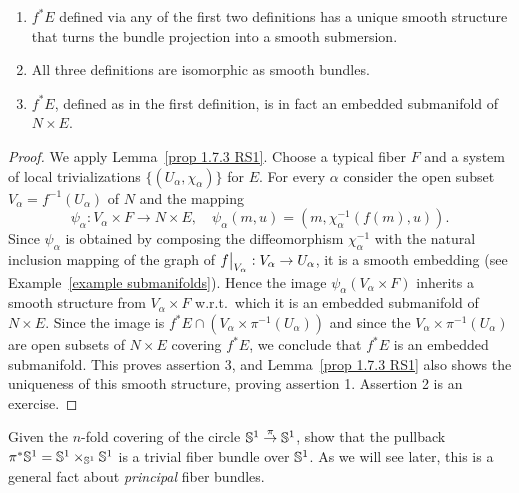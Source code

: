 \begin{prop}[{{\cite[Prop.~2.6.1]{RS1}}}]\label{prop 2.6.1 RS1}
\begin{enumerate}
    \item $f^\ast E$ defined via any of the first two definitions has a unique smooth structure that turns the bundle projection into a smooth submersion.
    \item All three definitions are isomorphic as smooth bundles.
    \item $f^\ast E$, defined as in the first definition, is in fact an embedded submanifold of $N\times E$.
\end{enumerate} 
\end{prop}
\begin{proof}
    We apply Lemma~\ref{prop 1.7.3 RS1}. Choose a typical fiber $F$ and a system of local trivializations $\{(U_\alpha,\chi_\alpha)\}$ for $E$. For every $\alpha$ consider the open subset $V_\alpha=f^{-1}(U_\alpha)$ of $N$ and the mapping  
    \[\psi_\alpha:V_\alpha\times F\to N\times E,\quad \psi_\alpha(m,u)=(m,\chi_\alpha^{-1}(f(m),u)).\]
    Since $\psi_\alpha$ is obtained by composing the diffeomorphism $\chi_\alpha^{-1}$ with the natural inclusion mapping of the graph of $\restr{f}{V_\alpha}:V_\alpha\to U_\alpha$, it is a smooth embedding (see Example~\ref{example submanifolds}). Hence the image $\psi_\alpha(V_\alpha\times F)$ inherits a smooth structure from $V_\alpha\times F$ w.r.t.\ which it is an embedded submanifold of $N\times E$. Since the image is $f^\ast E\cap (V_\alpha\times\pi^{-1}(U_\alpha))$ and since the $V_\alpha\times\pi^{-1}(U_\alpha)$ are open subsets of $N\times E$ covering $f^\ast E$, we conclude that $f^\ast E$ is an embedded submanifold. This proves assertion 3, and Lemma~\ref{prop 1.7.3 RS1} also shows the uniqueness of this smooth structure, proving assertion 1. Assertion 2 is an exercise.
\end{proof}

\begin{xca}
    Given the $n$-fold covering of the circle $\mathbb{S}^1\overset{\pi}{\to}\mathbb{S}^1$, show that the pullback $\pi^\ast \mathbb{S}^1=\mathbb{S}^1\times_{\mathbb{S}^1} \mathbb{S}^1$ is a trivial fiber bundle over $\mathbb{S}^1$. As we will see later, this is a general fact about \emph{principal} fiber bundles.
\end{xca}

